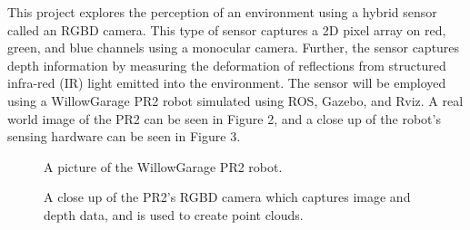 \documentclass[a4paper]{article}
\begin{document}
This project explores the perception of an environment using a hybrid sensor called an RGBD camera. This type of sensor captures a 2D pixel array on red, green, and blue channels using a monocular camera. Further, the sensor captures depth information by measuring the deformation of reflections from structured infra-red (IR) light emitted into the environment. The sensor will be employed using a WillowGarage PR2 robot simulated using ROS, Gazebo, and Rviz. A real world image of the PR2 can be seen in Figure 2, and a close up of the robot's sensing hardware can be seen in Figure 3.

\begin{figure}[H]
\centering
\begin{minipage}[t]{0.45\linewidth}
\centering
{}
\caption{A picture of the WillowGarage PR2 robot.}
\end{minipage}
\hspace{0.5cm}
\begin{minipage}[t]{0.45\linewidth}
\centering
{}
\caption{A close up of the PR2's RGBD camera which captures image and depth data, and is used to create point clouds.}
\end{minipage}
\end{figure}
\end{document}
